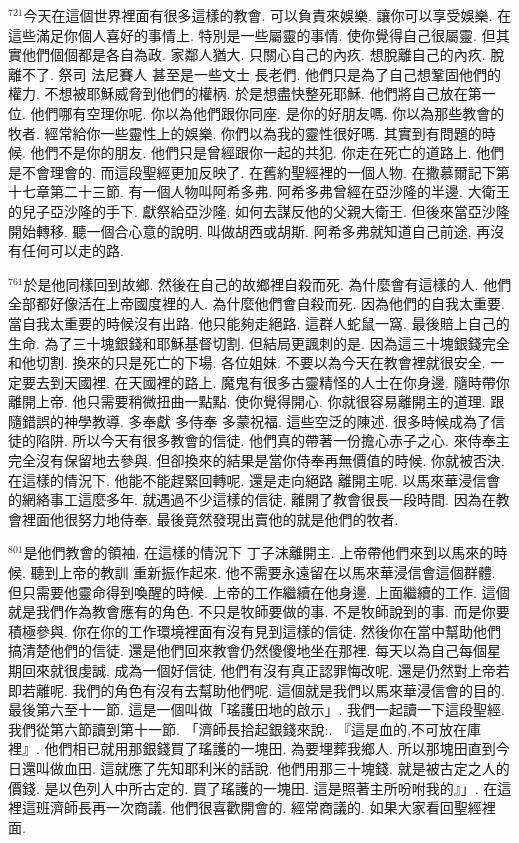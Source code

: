 \documentclass{book}
\begin{document}
$^{721}$今天在這個世界裡面有很多這樣的教會.
可以負責來娛樂.
讓你可以享受娛樂.
在這些滿足你個人喜好的事情上.
特別是一些屬靈的事情.
使你覺得自己很屬靈.
但其實他們個個都是各自為政.
家鄰人猶大.
只關心自己的內疚.
想脫離自己的內疚.
脫離不了.
祭司 法尼賽人 甚至是一些文士 長老們.
他們只是為了自己想鞏固他們的權力.
不想被耶穌威脅到他們的權柄.
於是想盡快整死耶穌.
他們將自己放在第一位.
他們哪有空理你呢.
你以為他們跟你同座.
是你的好朋友嗎.
你以為那些教會的牧者.
經常給你一些靈性上的娛樂.
你們以為我的靈性很好嗎.
其實到有問題的時候.
他們不是你的朋友.
他們只是曾經跟你一起的共犯.
你走在死亡的道路上.
他們是不會理會的.
而這段聖經更加反映了.
在舊約聖經裡的一個人物.
在撒慕爾記下第十七章第二十三節.
有一個人物叫阿希多弗.
阿希多弗曾經在亞沙隆的半邊.
大衛王的兒子亞沙隆的手下.
獻祭給亞沙隆.
如何去謀反他的父親大衛王.
但後來當亞沙隆開始轉移.
聽一個合心意的說明.
叫做胡西或胡斯.
阿希多弗就知道自己前途.
再沒有任何可以走的路.

$^{761}$於是他同樣回到故鄉.
然後在自己的故鄉裡自殺而死.
為什麼會有這樣的人.
他們全部都好像活在上帝國度裡的人.
為什麼他們會自殺而死.
因為他們的自我太重要.
當自我太重要的時候沒有出路.
他只能夠走絕路.
這群人蛇鼠一窩.
最後賠上自己的生命.
為了三十塊銀錢和耶穌基督切割.
但結局更諷刺的是.
因為這三十塊銀錢完全和他切割.
換來的只是死亡的下場.
各位姐妹.
不要以為今天在教會裡就很安全.
一定要去到天國裡.
在天國裡的路上.
魔鬼有很多古靈精怪的人士在你身邊.
隨時帶你離開上帝.
他只需要稍微扭曲一點點.
使你覺得開心.
你就很容易離開主的道理.
跟隨錯誤的神學教導.
多奉獻 多侍奉 多蒙祝福.
這些空泛的陳述.
很多時候成為了信徒的陷阱.
所以今天有很多教會的信徒.
他們真的帶著一份擔心赤子之心.
來侍奉主 完全沒有保留地去參與.
但卻換來的結果是當你侍奉再無價值的時候.
你就被否決.
在這樣的情況下.
他能不能趕緊回轉呢.
還是走向絕路 離開主呢.
以馬來華浸信會的網絡事工這麼多年.
就遇過不少這樣的信徒.
離開了教會很長一段時間.
因為在教會裡面他很努力地侍奉.
最後竟然發現出賣他的就是他們的牧者.

$^{801}$是他們教會的領袖.
在這樣的情況下 丁子沫離開主.
上帝帶他們來到以馬來的時候.
聽到上帝的教訓 重新振作起來.
他不需要永遠留在以馬來華浸信會這個群體.
但只需要他靈命得到喚醒的時候.
上帝的工作繼續在他身邊.
上面繼續的工作.
這個就是我們作為教會應有的角色.
不只是牧師要做的事.
不是牧師說到的事.
而是你要積極參與.
你在你的工作環境裡面有沒有見到這樣的信徒.
然後你在當中幫助他們搞清楚他們的信徒.
還是他們回來教會仍然傻傻地坐在那裡.
每天以為自己每個星期回來就很虔誠.
成為一個好信徒.
他們有沒有真正認罪悔改呢.
還是仍然對上帝若即若離呢.
我們的角色有沒有去幫助他們呢.
這個就是我們以馬來華浸信會的目的.
最後第六至十一節.
這是一個叫做「瑤護田地的啟示」.
我們一起讀一下這段聖經.
我們從第六節讀到第十一節.
「濟師長拾起銀錢來說:.
『這是血的,不可放在庫裡』.
他們相已就用那銀錢買了瑤護的一塊田.
為要埋葬我鄉人.
所以那塊田直到今日還叫做血田.
這就應了先知耶利米的話說.
他們用那三十塊錢.
就是被古定之人的價錢.
是以色列人中所古定的.
買了瑤護的一塊田.
這是照著主所吩咐我的』」.
在這裡這班濟師長再一次商議.
他們很喜歡開會的.
經常商議的.
如果大家看回聖經裡面.
\end{document}

